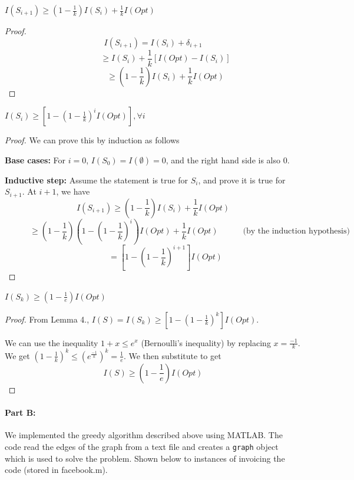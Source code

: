 \begin{lemma}
$I(S_{i+1})\geq(1-\frac{1}{k})I(S_{i})+\frac{1}{k}I(Opt)$
\end{lemma}

\begin{proof}
$$I(S_{i+1}) = I(S_{i})+\delta_{i+1}$$
$$\qquad\quad \geq I(S_{i})+\frac{1}{k}[I(Opt)-I(S_{i})] $$
$$\qquad\quad \geq \left(1-\frac{1}{k} \right)I(S_{i})+\frac{1}{k}I(Opt)$$
\end{proof}


\begin{lemma}
$I(S_{i})\geq[1-(1-\frac{1}{k})^{i}I(Opt)], \forall i$
\end{lemma}

\begin{proof}
We can prove this by induction as follows 



\noindent
\textbf{Base cases:} For $i=0$, $I(S_{0})=I(\emptyset)=0$, and the right hand side is also 0.


\noindent
\textbf{Inductive step:} Assume the statement is true for $S_{i}$, and prove it is true for $S_{i+1}$. At $i+1$, we have 
$$
I(S_{i+1}) \geq \left(1-\frac{1}{k} \right) I(S_{i})+ \frac{1}{k}I(Opt)
$$
$$
\qquad\quad \geq \left(1-\frac{1}{k}\right) \left(1- \left(1-\frac{1}{k}\right)^{i} \right)I(Opt) + \frac{1}{k}I(Opt) \quad \qquad \text{(by the induction hypothesis)}
$$
$$
\qquad \quad = [1-\left(1-\frac{1}{k} \right)^{i+1}]I(Opt)
$$
\end{proof}


\begin{lemma}
$I(S_{k})\geq (1-\frac{1}{e})I(Opt)$
\end{lemma}

\begin{proof}
From Lemma 4., $I(S) = I(S_{k}) \geq [1-(1-\frac{1}{k})^k]I(Opt)$. 

\noindent 
We can use the inequality $1+x\leq e^{x}$ (Bernoulli's inequality) by replacing $x=\frac{-1}{k}$. We get $\left(1-\frac{1}{k}\right)^{k}\leq \left( e^{\frac{-1}{k}} \right)^{k} = \frac{1}{e}$. We then substitute to get 
$$
I(S) \geq \left(1-\frac{1}{e}\right)I(Opt)
$$
\end{proof}


\paragraph{Part B:}
We implemented the greedy algorithm described above using MATLAB. The code read the edges of the graph from a text file and creates a \texttt{graph} object which is used to solve the problem. Shown below to instances of invoicing the code (stored in \textsf{facebook.m}).


